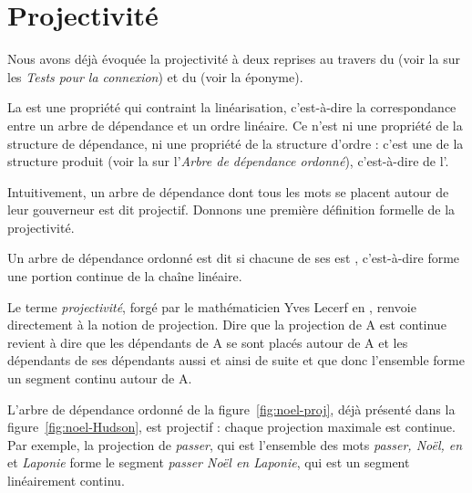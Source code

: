 \section{Projectivité}\label{sec:3.5.14}

Nous avons déjà évoquée la projectivité à deux reprises au travers du  (voir la  sur les \textit{Tests pour la connexion}) et du  (voir la  éponyme).

La  est une propriété qui contraint la linéarisation, c’est-à-dire la correspondance entre un arbre de dépendance et un ordre linéaire. Ce n’est ni une propriété de la structure de dépendance, ni une propriété de la structure d’ordre : c’est une  de la structure produit (voir la  sur l'\textit{Arbre de dépendance ordonné}), c’est-à-dire de l'.


Intuitivement, un arbre de dépendance dont tous les mots se placent autour de leur gouverneur est dit projectif. Donnons une première définition formelle de la projectivité.%

{Un arbre de dépendance ordonné est dit  si chacune de ses  est , c’est-à-dire forme une portion continue de la chaîne linéaire.}

Le terme \textit{projectivité}, forgé par le mathématicien Yves Lecerf en \citeyear{lecerf1960programme}, renvoie directement à la notion de projection. Dire que la projection de A est continue revient à dire que les dépendants de A se sont placés autour de A et les dépendants de ses dépendants aussi et ainsi de suite et que donc l’ensemble forme un segment continu autour de A.

L’arbre de dépendance ordonné de la figure~\ref{fig:noel-proj}, déjà présenté dans la figure~\ref{fig:noel-Hudson}, est projectif : chaque projection maximale est continue. Par exemple, la projection de \textit{passer}, qui est l’ensemble des mots \textit{passer, Noël, en} et \textit{Laponie} forme le segment \textit{passer Noël en Laponie}, qui est un segment linéairement continu.

